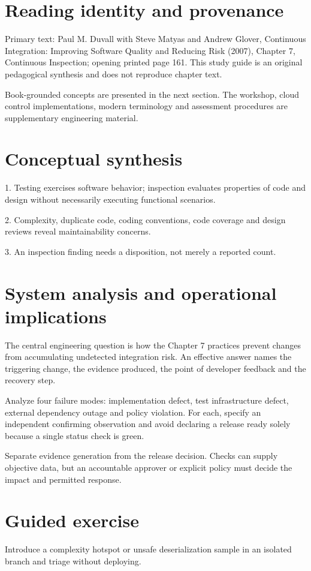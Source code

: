 \documentclass[11pt,letterpaper]{article}
\begin{document}
\makedoctitle
\makedocsummary
\tableofcontents
\clearpage
\section{Reading identity and provenance}
Primary text: Paul M. Duvall with Steve Matyas and Andrew Glover, Continuous Integration: Improving Software Quality and Reducing Risk (2007), Chapter 7, Continuous Inspection; opening printed page 161. This study guide is an original pedagogical synthesis and does not reproduce chapter text.

Book-grounded concepts are presented in the next section. The workshop, cloud control implementations, modern terminology and assessment procedures are supplementary engineering material.

\section{Conceptual synthesis}
1. Testing exercises software behavior; inspection evaluates properties of code and design without necessarily executing functional scenarios.

2. Complexity, duplicate code, coding conventions, code coverage and design reviews reveal maintainability concerns.

3. An inspection finding needs a disposition, not merely a reported count.

\section{System analysis and operational implications}
The central engineering question is how the Chapter 7 practices prevent changes from accumulating undetected integration risk. An effective answer names the triggering change, the evidence produced, the point of developer feedback and the recovery step.

Analyze four failure modes: implementation defect, test infrastructure defect, external dependency outage and policy violation. For each, specify an independent confirming observation and avoid declaring a release ready solely because a single status check is green.

Separate evidence generation from the release decision. Checks can supply objective data, but an accountable approver or explicit policy must decide the impact and permitted response.

\section{Guided exercise}
Introduce a complexity hotspot or unsafe deserialization sample in an isolated branch and triage without deploying.
\end{document}

